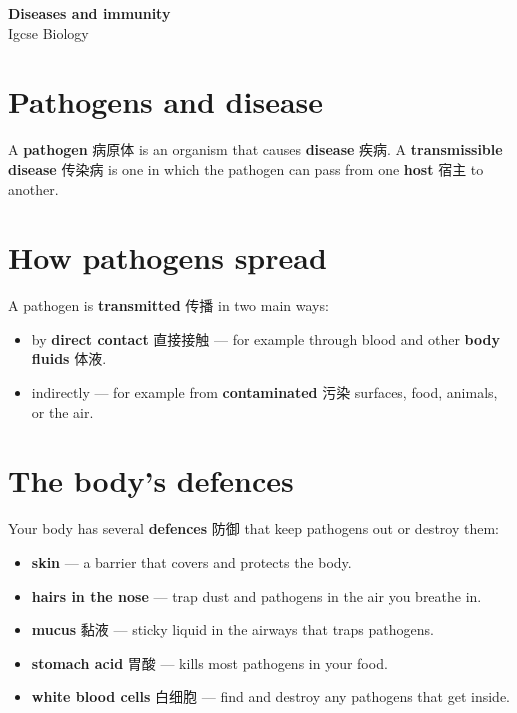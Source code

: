 \documentclass[11pt]{article}
\begin{document}
\begin{center}
  {\LARGE\bfseries Diseases and immunity}\\[0.35em]
  {\large Igcse Biology}
\end{center}
\vspace{0.6em}

\section*{Pathogens and disease}

A \textbf{pathogen} 病原体 is an organism that causes \textbf{disease} 疾病. A \textbf{transmissible disease} 传染病 is one in which the pathogen can pass from one \textbf{host} 宿主 to another.

\section*{How pathogens spread}

A pathogen is \textbf{transmitted} 传播 in two main ways:

\begin{itemize}
\item by \textbf{direct contact} 直接接触 — for example through blood and other \textbf{body fluids} 体液.

\item indirectly — for example from \textbf{contaminated} 污染 surfaces, food, animals, or the air.

\end{itemize}

\section*{The body's defences}

Your body has several \textbf{defences} 防御 that keep pathogens out or destroy them:

\begin{itemize}
\item \textbf{skin} — a barrier that covers and protects the body.

\item \textbf{hairs in the nose} — trap dust and pathogens in the air you breathe in.

\item \textbf{mucus} 黏液 — sticky liquid in the airways that traps pathogens.

\item \textbf{stomach acid} 胃酸 — kills most pathogens in your food.

\item \textbf{white blood cells} 白细胞 — find and destroy any pathogens that get inside.

\end{itemize}
\end{document}

